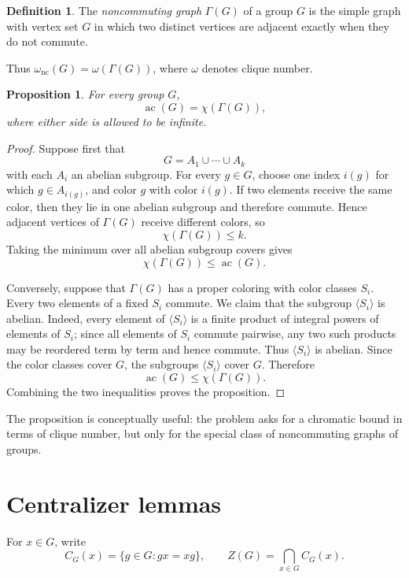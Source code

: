 \documentclass[11pt]{article}
\newtheorem{proposition}[theorem]{Proposition}
\theoremstyle{definition}
\newtheorem{definition}[theorem]{Definition}
\newcommand{\nc}{\omega_{\mathrm{nc}}}
\newcommand{\ac}{\operatorname{ac}}
\begin{document}
\begin{definition}
The \emph{noncommuting graph} $\Gamma(G)$ of a group $G$ is the simple graph with vertex set $G$ in which two distinct vertices are adjacent exactly when they do not commute.
\end{definition}

Thus $\nc(G)=\omega(\Gamma(G))$, where $\omega$ denotes clique number.

\begin{proposition}\label{prop:cover-equals-chromatic}
For every group $G$,
\[
 \ac(G)=\chi(\Gamma(G)),
\]
where either side is allowed to be infinite.
\end{proposition}

\begin{proof}
Suppose first that
\[
 G=A_1\cup\cdots\cup A_k
\]
with each $A_i$ an abelian subgroup.  For every $g\in G$, choose one index $i(g)$ for which $g\in A_{i(g)}$, and color $g$ with color $i(g)$.  If two elements receive the same color, then they lie in one abelian subgroup and therefore commute.  Hence adjacent vertices of $\Gamma(G)$ receive different colors, so
\[
 \chi(\Gamma(G))\le k.
\]
Taking the minimum over all abelian subgroup covers gives
\[
 \chi(\Gamma(G))\le\ac(G).
\]

Conversely, suppose that $\Gamma(G)$ has a proper coloring with color classes $S_i$.  Every two elements of a fixed $S_i$ commute.  We claim that the subgroup $\langle S_i\rangle$ is abelian.  Indeed, every element of $\langle S_i\rangle$ is a finite product of integral powers of elements of $S_i$; since all elements of $S_i$ commute pairwise, any two such products may be reordered term by term and hence commute.  Thus $\langle S_i\rangle$ is abelian.  Since the color classes cover $G$, the subgroups $\langle S_i\rangle$ cover $G$.  Therefore
\[
 \ac(G)\le\chi(\Gamma(G)).
\]
Combining the two inequalities proves the proposition.
\end{proof}

The proposition is conceptually useful: the problem asks for a chromatic bound in terms of clique number, but only for the special class of noncommuting graphs of groups.

\section{Centralizer lemmas}

For $x\in G$, write
\[
 C_G(x)=\{g\in G:gx=xg\},
\qquad
 Z(G)=\bigcap_{x\in G}C_G(x).
\]
\end{document}
